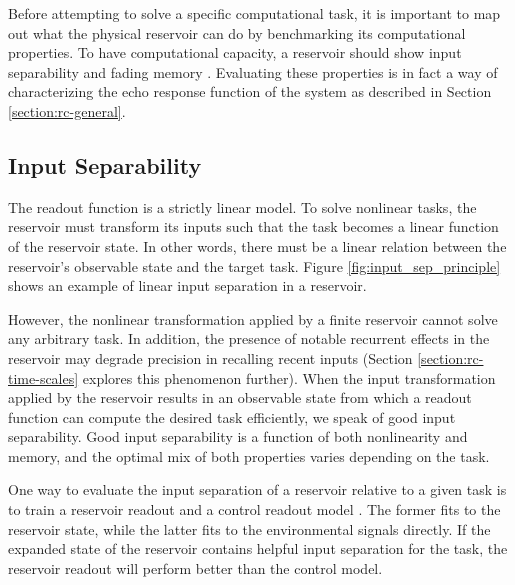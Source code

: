 
Before attempting to solve a specific computational task, it is important to 
map out what the physical reservoir can do by benchmarking its computational properties.
To have computational capacity, a reservoir should show input separability and fading memory \citep{nakajima_information_2015}.
Evaluating these properties is in fact a way of characterizing the echo response function of the system as described in Section \ref{section:rc-general}.


\subsection{Input Separability}

The readout function is a strictly linear model. 
To solve nonlinear tasks, the reservoir must transform its inputs such that the task becomes a linear function of the reservoir state.
In other words, there must be a linear relation between the reservoir's observable state and the target task.
Figure \ref{fig:input_sep_principle} shows an example of linear input separation in a reservoir.

However, the nonlinear transformation applied by a finite reservoir cannot solve any arbitrary task.
In addition, the presence of notable recurrent effects in the reservoir may degrade precision in recalling recent inputs (Section \ref{section:rc-time-scales} explores this phenomenon further).
When the input transformation applied by the reservoir results in an observable state from which a readout function can compute the desired task efficiently, we speak of good input separability.
Good input separability is a function of both nonlinearity and memory, and the optimal mix of both properties varies depending on the task.


One way to evaluate the input separation of a reservoir relative to a given task is to train a reservoir readout and a control readout model \citep{ushio_computational_2021}. 
The former fits to the reservoir state, while the latter fits to the environmental signals directly.
If the expanded state of the reservoir contains helpful input separation for the task, the reservoir readout will perform better than the control model.


